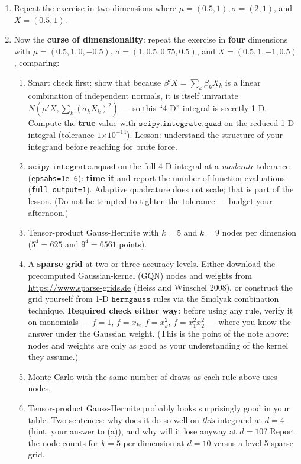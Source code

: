 \documentclass{article}
\providecommand{\e}[1]{\ensuremath{\times 10^{#1}}}
\begin{document}
\begin{enumerate}
\item Repeat the exercise in two dimensions where $\mu = (0.5,1), \sigma = (2,1)$, and $X=(0.5,1)$.
\item Now the \textbf{curse of dimensionality}: repeat the exercise in \textbf{four} dimensions with $\mu = (0.5, 1, 0, -0.5)$, $\sigma = (1, 0.5, 0.75, 0.5)$, and $X = (0.5, 1, -1, 0.5)$, comparing:
\begin{enumerate}
\item Smart check first: show that because $\beta' X = \sum_k \beta_k X_k$ is a linear combination of independent normals, it is itself univariate $N\left(\mu'X, \sum_k (\sigma_k X_k)^2\right)$ --- so this ``4-D'' integral is secretly 1-D. Compute the \textbf{true} value with $\mathtt{scipy.integrate.quad}$ on the reduced 1-D integral (tolerance $1\e{-14}$). Lesson: understand the structure of your integrand before reaching for brute force.
\item $\mathtt{scipy.integrate.nquad}$ on the full 4-D integral at a \emph{moderate} tolerance (\texttt{epsabs=1e-6}): \textbf{time it} and report the number of function evaluations (\texttt{full\_output=1}). Adaptive quadrature does not scale; that is part of the lesson. (Do not be tempted to tighten the tolerance --- budget your afternoon.)
\item Tensor-product Gauss-Hermite with $k=5$ and $k=9$ nodes per dimension ($5^4 = 625$ and $9^4=6561$ points).
\item A \textbf{sparse grid} at two or three accuracy levels. Either download the precomputed Gaussian-kernel (GQN) nodes and weights from \url{https://www.sparse-grids.de} (Heiss and Winschel 2008), or construct the grid yourself from 1-D $\mathtt{hermgauss}$ rules via the Smolyak combination technique. \textbf{Required check either way}: before using any rule, verify it on monomials --- $f=1$, $f = x_k$, $f = x_k^2$, $f=x_1^2 x_2^2$ --- where you know the answer under the Gaussian weight. (This is the point of the note above: nodes and weights are only as good as your understanding of the kernel they assume.)
\item Monte Carlo with the same number of draws as each rule above uses nodes.
\item Tensor-product Gauss-Hermite probably looks surprisingly good in your table. Two sentences: why does it do so well on \emph{this} integrand at $d=4$ (hint: your answer to (a)), and why will it lose anyway at $d=10$? Report the node counts for $k=5$ per dimension at $d=10$ versus a level-5 sparse grid.
\end{enumerate}

\end{enumerate}
\end{document}

